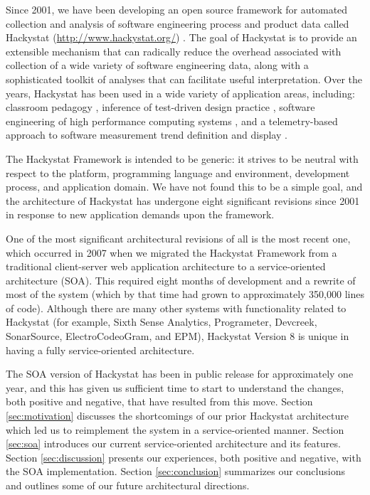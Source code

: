 \documentclass[conference,compsoc,peerreview]{IEEEtran}
\begin{document}
Since 2001, we have been developing an open source framework for automated
collection and analysis of software engineering process and product data
called Hackystat (\url{http://www.hackystat.org/})
\cite{csdl2-06-06,csdl2-02-07}.  The goal of Hackystat is to provide an
extensible mechanism that can radically reduce the overhead associated with
collection of a wide variety of software engineering data, along with a
sophisticated toolkit of analyses that can facilitate useful
interpretation.  Over the years, Hackystat has been used in a wide variety
of application areas, including: classroom pedagogy \cite{csdl2-03-12},
inference of test-driven design practice \cite{csdl2-06-13}, software
engineering of high performance computing systems \cite{csdl2-06-08}, and a
telemetry-based approach to software measurement trend definition and
display \cite{csdl2-04-11}.

The Hackystat Framework is intended to be generic: it strives to be neutral
with respect to the platform, programming language and environment,
development process, and application domain.  We have not found this to be
a simple goal, and the architecture of Hackystat has undergone eight
significant revisions since 2001 in response to new application demands
upon the framework.

One of the most significant architectural revisions of all is the most
recent one, which occurred in 2007 when we migrated the Hackystat Framework
from a traditional client-server web application architecture to a
service-oriented architecture (SOA).  This required eight months of development
and a rewrite of most of the system (which by that time had grown to
approximately 350,000 lines of code).  Although there are many other 
systems with functionality related to Hackystat (for example, Sixth Sense Analytics, 
Programeter, Devcreek, SonarSource, ElectroCodeoGram, and EPM), Hackystat Version 8 is unique
in having a fully service-oriented architecture. 

The SOA version of Hackystat has been in public release for approximately
one year, and this has given us sufficient time to start to understand the
changes, both positive and negative, that have resulted from this move.
Section \ref{sec:motivation} discusses the shortcomings of our prior
Hackystat architecture which led us to reimplement the system in a
service-oriented manner.  Section \ref{sec:soa} introduces our current
service-oriented architecture and its features.  Section
\ref{sec:discussion} presents our experiences, both positive and negative,
with the SOA implementation.  Section \ref{sec:conclusion} summarizes our
conclusions and outlines some of our future architectural directions.
\end{document}
